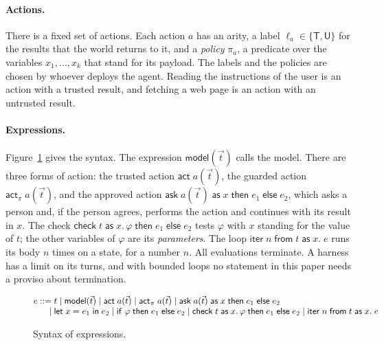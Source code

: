 \documentclass[acmsmall,nonacm,screen]{acmart}
\newcommand{\kw}[1]{\mathsf{#1}}
\newcommand{\T}{\kw{T}}
\newcommand{\U}{\kw{U}}
\newcommand{\model}[1]{\kw{model}(#1)}
\newcommand{\act}[2]{\kw{act}\;#1(#2)}
\newcommand{\grd}[2]{\kw{act}_\pi\;#1(#2)}
\newcommand{\ask}[5]{\kw{ask}\;#1(#2)\;\kw{as}\;#3\;\kw{then}\;#4\;\kw{else}\;#5}
\newcommand{\chk}[5]{\kw{check}\;#1\;\kw{as}\;#2.\,#3\;\kw{then}\;#4\;\kw{else}\;#5}
\newcommand{\letin}[2]{\kw{let}\;#1 = #2\;\kw{in}}
\newcommand{\ite}[3]{\kw{if}\;#1\;\kw{then}\;#2\;\kw{else}\;#3}
\newcommand{\iter}[4]{\kw{iter}\;#1\;\kw{from}\;#2\;\kw{as}\;#3.\;#4}
\begin{document}
\paragraph{Actions.} There is a fixed set of actions. Each action $a$ has an arity, a label
$\ell_a \in \{\T, \U\}$ for the results that the world returns to it, and a \emph{policy}
$\pi_a$, a predicate over the variables $x_1, \ldots, x_k$ that stand for its payload. The
labels and the policies are chosen by whoever deploys the agent. Reading the instructions of
the user is an action with a trusted result, and fetching a web page is an action with an
untrusted result.

\paragraph{Expressions.} Figure~\ref{fig:syntax} gives the syntax. The expression
$\model{\vec t}$ calls the model. There are three forms of action: the trusted action
$\act{a}{\vec t}$, the guarded action $\grd{a}{\vec t}$, and the approved action
$\ask{a}{\vec t}{x}{e_1}{e_2}$, which asks a person and, if the person agrees, performs the
action and continues with its result in $x$. The check $\chk{t}{x}{\varphi}{e_1}{e_2}$ tests
$\varphi$ with $x$ standing for the value of $t$; the other variables of $\varphi$ are its
\emph{parameters}. The loop $\iter{n}{t}{x}{e}$ runs its body $n$ times on a state, for a
number $n$. All evaluations terminate. A harness has a limit on its turns, and with bounded
loops no statement in this paper needs a proviso about termination.

\begin{figure}[t]
\[
\begin{array}{@{}r@{\;}l@{}}
e ::= & t \mid \model{\vec t} \mid \act{a}{\vec t} \mid \grd{a}{\vec t}
  \mid \ask{a}{\vec t}{x}{e_1}{e_2} \\
\mid & \letin{x}{e_1}\; e_2 \mid \ite{\varphi}{e_1}{e_2} \mid \chk{t}{x}{\varphi}{e_1}{e_2}
  \mid \iter{n}{t}{x}{e}
\end{array}
\]
\caption{Syntax of expressions.}
\label{fig:syntax}
\end{figure}
\end{document}
